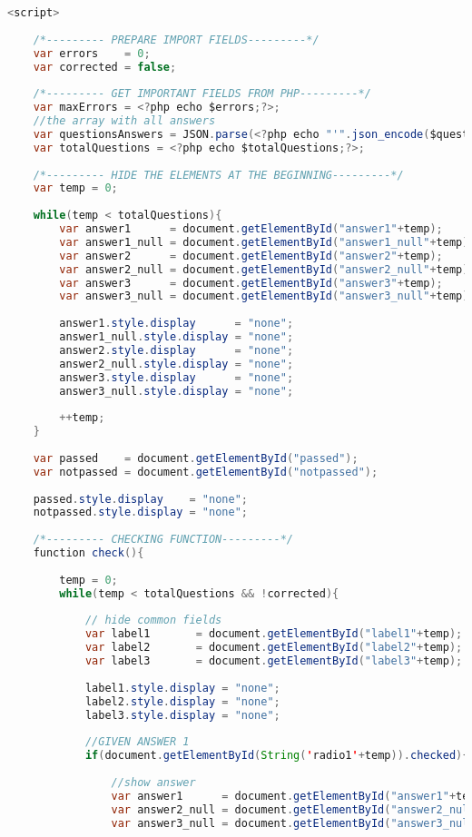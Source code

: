 \begin{lstlisting}[language=java]
	<script>
	
	/*--------- PREPARE IMPORT FIELDS---------*/
	var errors    = 0;
	var corrected = false;
	
	/*--------- GET IMPORTANT FIELDS FROM PHP---------*/
	var maxErrors = <?php echo $errors;?>;
	//the array with all answers
	var questionsAnswers = JSON.parse(<?php echo "'".json_encode($questionsAnswers)."'"; ?>);
	var totalQuestions = <?php echo $totalQuestions;?>;
	
	/*--------- HIDE THE ELEMENTS AT THE BEGINNING---------*/
	var temp = 0;
	
	while(temp < totalQuestions){
		var answer1      = document.getElementById("answer1"+temp);
		var answer1_null = document.getElementById("answer1_null"+temp);
		var answer2      = document.getElementById("answer2"+temp);
		var answer2_null = document.getElementById("answer2_null"+temp);
		var answer3      = document.getElementById("answer3"+temp);
		var answer3_null = document.getElementById("answer3_null"+temp);
		
		answer1.style.display      = "none";
		answer1_null.style.display = "none";
		answer2.style.display      = "none";
		answer2_null.style.display = "none";
		answer3.style.display      = "none";
		answer3_null.style.display = "none";
		
		++temp;
	}
	
	var passed    = document.getElementById("passed");
	var notpassed = document.getElementById("notpassed");
	
	passed.style.display    = "none";
	notpassed.style.display = "none";
	
	/*--------- CHECKING FUNCTION---------*/
	function check(){
		
		temp = 0;
		while(temp < totalQuestions && !corrected){
			
			// hide common fields
			var label1       = document.getElementById("label1"+temp);
			var label2       = document.getElementById("label2"+temp);
			var label3       = document.getElementById("label3"+temp);
			
			label1.style.display = "none";
			label2.style.display = "none";
			label3.style.display = "none";
			
			//GIVEN ANSWER 1
			if(document.getElementById(String('radio1'+temp)).checked){
				
				//show answer
				var answer1      = document.getElementById("answer1"+temp);
				var answer2_null = document.getElementById("answer2_null"+temp);
				var answer3_null = document.getElementById("answer3_null"+temp);
				

\end{lstlisting}
